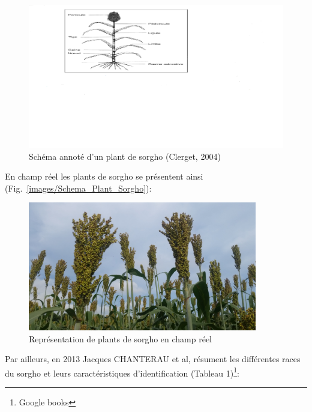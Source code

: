 \documentclass[a4paper,11pt]{article}
\begin{document}

\begin{figure}%
  \begin{center}
    \includegraphics[width=18cm]{images/Schema_Plant_Sorgho}
  \end{center}
\caption{Schéma annoté d’un plant de sorgho (Clerget, 2004)}
\end{figure}


En champ réel les plants de sorgho se présentent ainsi (Fig.~\ref{images/Schema_Plant_Sorgho}):

\begin{figure}%
  \begin{center}
    \includegraphics[width=10cm]{images/PlantDeSorgho}
  \end{center}
\caption{Représentation de plants de sorgho en champ réel}
\end{figure}

Par ailleurs, en 2013 Jacques CHANTERAU et al, résument les
différentes races du sorgho et leurs caractéristiques d'identification
(Tableau 1)\footnote{Google books}:

\end{document}

